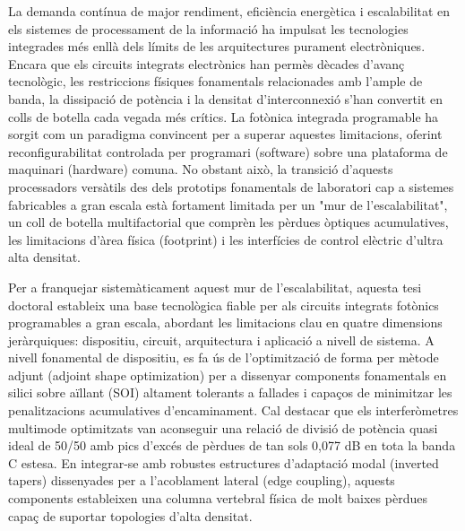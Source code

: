 La demanda contínua de major rendiment, eficiència energètica i escalabilitat en els sistemes de 
processament de la informació ha impulsat les tecnologies integrades més enllà dels límits de les 
arquitectures purament electròniques. Encara que els circuits integrats electrònics han permès 
dècades d'avanç tecnològic, les restriccions físiques fonamentals relacionades amb l'ample de 
banda, la dissipació de potència i la densitat d'interconnexió s'han convertit en colls de botella 
cada vegada més crítics. La fotònica integrada programable ha sorgit com un paradigma convincent 
per a superar aquestes limitacions, oferint reconfigurabilitat controlada per programari (software) 
sobre una plataforma de maquinari (hardware) comuna. No obstant això, la transició d'aquests 
processadors versàtils des dels prototips fonamentals de laboratori cap a sistemes fabricables a 
gran escala està fortament limitada per un "mur de l'escalabilitat", un coll de botella 
multifactorial que comprèn les pèrdues òptiques acumulatives, les limitacions d'àrea física 
(footprint) i les interfícies de control elèctric d'ultra alta densitat.

Per a franquejar sistemàticament aquest mur de l'escalabilitat, aquesta tesi doctoral estableix una 
base tecnològica fiable per als circuits integrats fotònics programables a gran escala, abordant 
les limitacions clau en quatre dimensions jeràrquiques: dispositiu, circuit, arquitectura i 
aplicació a nivell de sistema. A nivell fonamental de dispositiu, es fa ús de l'optimització de 
forma per mètode adjunt (adjoint shape optimization) per a dissenyar components fonamentals en 
silici sobre aïllant (SOI) altament tolerants a fallades i capaços de minimitzar les penalitzacions 
acumulatives d'encaminament. Cal destacar que els interferòmetres multimode optimitzats van 
aconseguir una relació de divisió de potència quasi ideal de 50/50 amb pics d'excés de pèrdues de 
tan sols 0,077 dB en tota la banda C estesa. En integrar-se amb robustes estructures d'adaptació 
modal (inverted tapers) dissenyades per a l'acoblament lateral (edge coupling), aquests components 
estableixen una columna vertebral física de molt baixes pèrdues capaç de suportar topologies d'alta 
densitat.

